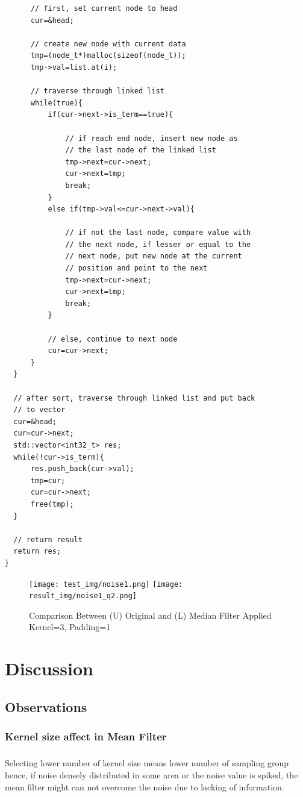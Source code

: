 \documentclass[12pt,a4paper]{report}
\begin{document}
\begin{lstlisting}
      // first, set current node to head
      cur=&head;

      // create new node with current data
      tmp=(node_t*)malloc(sizeof(node_t));
      tmp->val=list.at(i);

      // traverse through linked list
      while(true){
          if(cur->next->is_term==true){

              // if reach end node, insert new node as
              // the last node of the linked list
              tmp->next=cur->next;
              cur->next=tmp;
              break;
          }
          else if(tmp->val<=cur->next->val){

              // if not the last node, compare value with
              // the next node, if lesser or equal to the 
              // next node, put new node at the current 
              // position and point to the next
              tmp->next=cur->next;
              cur->next=tmp;
              break;
          }

          // else, continue to next node
          cur=cur->next;
      }
  }

  // after sort, traverse through linked list and put back 
  // to vector
  cur=&head;
  cur=cur->next;
  std::vector<int32_t> res;
  while(!cur->is_term){
      res.push_back(cur->val);
      tmp=cur;
      cur=cur->next;
      free(tmp);
  }

  // return result
  return res;
}
\end{lstlisting}
\begin{figure}[!htb]
  \centering
  \texttt{[image: test\_img/noise1.png]}
  \texttt{[image: result\_img/noise1\_q2.png]}
  \caption{Comparison Between (U) Original and (L) Median Filter Applied Kernel=3, Padding=1}
\end{figure}
\clearpage


\chapter{Discussion}
\section{Observations}
\subsection{Kernel size affect in Mean Filter}
\paragraph*{}
Selecting lower number of kernel size means lower number of sampling group hence, if noise densely distributed in some area or the noise value is spiked, the mean filter might can not overcome the noise due to lacking of information.
\end{document}
